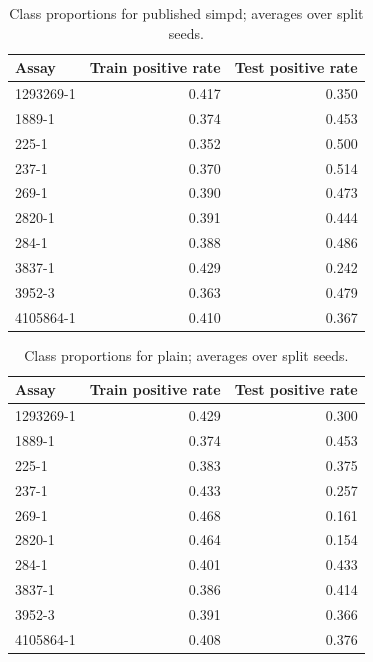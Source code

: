 \begin{table}[htbp]\centering\small
\begin{tabular}{lrr}
\toprule
Assay & Train positive rate & Test positive rate \\
\midrule
1293269-1 & 0.417 & 0.350 \\
1889-1 & 0.374 & 0.453 \\
225-1 & 0.352 & 0.500 \\
237-1 & 0.370 & 0.514 \\
269-1 & 0.390 & 0.473 \\
2820-1 & 0.391 & 0.444 \\
284-1 & 0.388 & 0.486 \\
3837-1 & 0.429 & 0.242 \\
3952-3 & 0.363 & 0.479 \\
4105864-1 & 0.410 & 0.367 \\
\bottomrule
\end{tabular}

\caption{Class proportions for published simpd; averages over split seeds.}\end{table}
\begin{table}[htbp]\centering\small
\begin{tabular}{lrr}
\toprule
Assay & Train positive rate & Test positive rate \\
\midrule
1293269-1 & 0.429 & 0.300 \\
1889-1 & 0.374 & 0.453 \\
225-1 & 0.383 & 0.375 \\
237-1 & 0.433 & 0.257 \\
269-1 & 0.468 & 0.161 \\
2820-1 & 0.464 & 0.154 \\
284-1 & 0.401 & 0.433 \\
3837-1 & 0.386 & 0.414 \\
3952-3 & 0.391 & 0.366 \\
4105864-1 & 0.408 & 0.376 \\
\bottomrule
\end{tabular}

\caption{Class proportions for plain; averages over split seeds.}\end{table}
